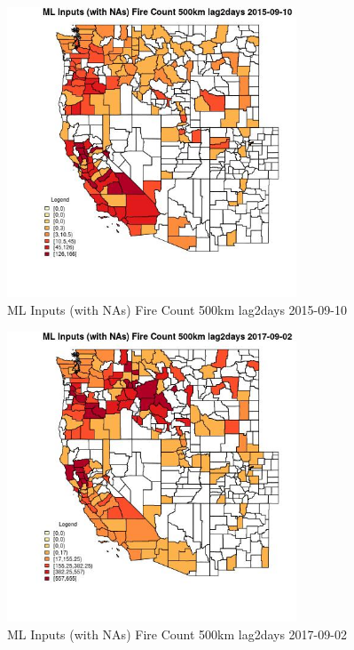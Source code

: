 \begin{figure} 
\centering  
\includegraphics[width=0.77\textwidth]{Code_Outputs/Report_ML_input_PM25_Step4_part_e_de_duplicated_aves_compiled_2019-05-21wNAs_CountyFire_Count_500km_lag2daysMean2015-09-10.jpg} 
\caption{\label{fig:Report_ML_input_PM25_Step4_part_e_de_duplicated_aves_compiled_2019-05-21wNAsCountyFire_Count_500km_lag2daysMean2015-09-10}ML Inputs (with NAs) Fire Count 500km lag2days 2015-09-10} 
\end{figure} 
 

\begin{figure} 
\centering  
\includegraphics[width=0.77\textwidth]{Code_Outputs/Report_ML_input_PM25_Step4_part_e_de_duplicated_aves_compiled_2019-05-21wNAs_CountyFire_Count_500km_lag2daysMean2017-09-02.jpg} 
\caption{\label{fig:Report_ML_input_PM25_Step4_part_e_de_duplicated_aves_compiled_2019-05-21wNAsCountyFire_Count_500km_lag2daysMean2017-09-02}ML Inputs (with NAs) Fire Count 500km lag2days 2017-09-02} 
\end{figure} 
 

